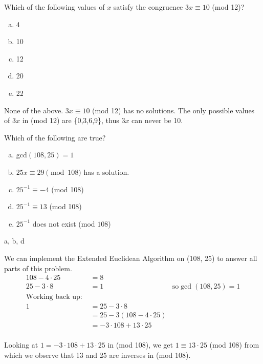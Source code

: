 Which of the following values of $x$ satisfy the congruence $3x \equiv 10$ (mod 12)?
\begin{enumerate}[(a)]
	\item  4

	\item  10

	\item  12

	\item  20

	\item  22

\end{enumerate}
\begin{solution}

None of the above. $3x \equiv 10$ (mod 12) has no solutions. The only possible values of $3x$ in (mod 12) are \{0,3,6,9\}, thus $3x$ can never be 10.

\end{solution}


Which of the following are true?

\begin{enumerate}[(a)]
	\item  gcd$(108,25) = 1$

	\item  $25x \equiv 29 \pmod{108}$ has a solution.

	\item  $25^{-1} \equiv -4$  (mod  108)

	\item  $25^{-1} \equiv 13$  (mod 108)

	\item  $25^{-1}$ does not exist  (mod $108$)

\end{enumerate}
\begin{solution}
 a, b, d

We can implement the Extended Euclidean Algorithm on (108, 25) to answer all parts of this problem.
    \begin{align*}
        108-4\cdot 25 &=8 &\\
        25 -3 \cdot 8 &= 1 & \text{so} \gcd(108,25)=1\\
        \text{Working back up: }\\
        1&= 25-3\cdot 8 \\
         &= 25 - 3(108 - 4 \cdot 25) \\
         &= -3\cdot 108 +13 \cdot 25 \\
    \end{align*}
    

Looking at $1= -3\cdot 108 +13 \cdot 25$ in (mod 108), we get $1 \equiv 13 \cdot 25$ (mod 108) from which we observe that 13 and 25 are inverses in (mod 108). 

\end{solution}


